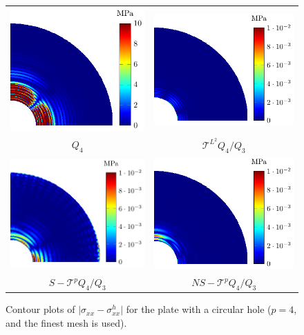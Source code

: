 \documentclass{article}
\begin{document}
\begin{figure}[htb!]
    \center
    \begin{tabular}{cc}
    \includegraphics[width=.44\linewidth]{no} & \includegraphics[width=.5\linewidth]{g}\\
    $Q_4$ & $\mathcal{T}^{L^2} Q_4/Q_3$\\
    \includegraphics[width=.5\linewidth]{s} & \includegraphics[width=.5\linewidth]{ns}\\
    $S-\mathcal{T}^{p} Q_4/Q_3$ & $NS-\mathcal{T}^{p} Q_4/Q_3$
    \end{tabular}
        \caption{Contour plots of $\vert{\sigma_{xx}-\sigma_{xx}^h}\vert$ for the plate with a circular hole ($p=4$, and the finest mesh is used).}
        \label{fig:platewithhole_error_contour}
\end{figure}
\end{document}
